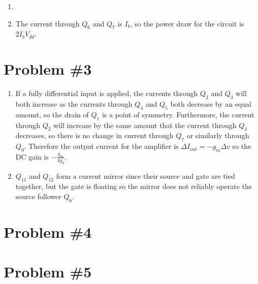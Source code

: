 \documentclass{article}
\begin{document}
\begin{enumerate}
{\begin{circuitikz}
  (q1.source) -- ++(0,0) node[sground] {}
  (q1.gate)   -- (q8.gate)

  (q8.source) -- ++(0,0) node[sground] {}
  (q8.gate)   node[circ] {} |- (q8.drain) node[circ] {}

  (q7.drain)  to[I, i=$I_b$] (q8.drain)
  (q7.source) -- ++(0,0) node[rground, yscale=-1] {}
  (q7.gate)   node[circ] {} |- (q7.drain) node[circ] {}

  (q6.source) -- ++(0,0) node[rground, yscale=-1] {}
  (q6.gate) -- (q7.gate)
;\end{circuitikz}

A fully differential input to this amplifier will cause no change in the 
current through $Q_1$, and thus no change in the voltage at the source of
the input stage transistors. Therefore this is a point of symmetry. As
$V_{in}^{+}$ increases by $\Delta v$ and $V_{in}^{-}$ decreases by 
$\Delta v$, the current through $Q_2$ increases by $g_m \Delta v$ and the
current through $Q_3$ (as reflected by the current mirror $Q_5$) decreases
by $g_m \Delta v$. Therefore the change in output current is 
$-g_m \Delta v - g_m \Delta v = -2 g_m \Delta v$. The output resistance is
the drain resistance $\frac{1}{g_d}$ of $Q_2$ in parallel with the drain
resistance $\frac{1}{g_d}$ of $Q_3$ and is thus about $\frac{1}{2g_d}$, so
the DC gain is
$$
A_v = \frac{-2 \frac{g_m}{g_d} \Delta v}{2 \Delta v} = -\frac{g_m}{g_d}.
$$ 
}
\item
{
}
\item
{
The current through $Q_6$ and $Q_7$ is $I_b$, so the power draw for the circuit
is $2 I_b V_{dd}$.
}
\end{enumerate}



\section*{Problem \#3}
\begin{enumerate}
\item{
If a fully differential input is applied, the currents through $Q_2$ and
$Q_3$ will both increase as the currents through $Q_4$ and $Q_5$ both 
decrease by an equal amount, so the drain of $Q_1$ is a point of symmetry.
Furthermore, the current through $Q_2$ will increase by the same amount 
that the current through $Q_4$ decreases, so there is no change in 
current through $Q_7$ or similarly through $Q_9$. Therefore the 
output current for the amplifier is $\Delta I_{out} = -g_m \Delta v$
so the DC gain is $-\frac{g_m}{4 g_d}$.
}
\item{
$Q_{11}$ and $Q_{12}$ form a current mirror since their source and gate are 
tied together, but the gate is floating so the mirror does not reliably 
operate the source follower $Q_6$.

}
\end{enumerate}

\section*{Problem \#4}


\section*{Problem \#5}
\end{document}
